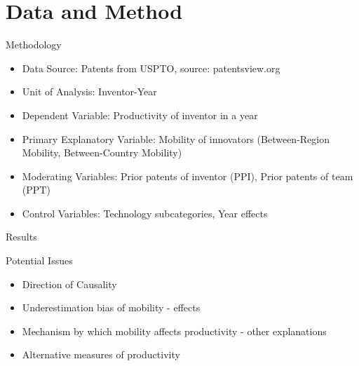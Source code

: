 \documentclass{beamer}
\begin{document}
\section{Data and Method}
\begin{frame}{Methodology}{}
\begin{itemize}
\item{Data Source: Patents from USPTO, source: patentsview.org}
\item{Unit of Analysis: Inventor-Year}
\item{Dependent Variable: Productivity of inventor in a year}
\item{Primary Explanatory Variable: Mobility of innovators (Between-Region Mobility, Between-Country Mobility)}
\item{Moderating Variables: Prior patents of inventor (PPI), Prior patents of team (PPT) }
\item{Control Variables: Technology subcategories,  Year effects}
\end{itemize}
\end{frame}

\begin{frame}{Results}{}

\end{frame}

\begin{frame}{Potential Issues}{}
\begin{itemize}
\item{Direction of Causality}
\item{Underestimation bias of mobility - effects}
\item{Mechanism by which mobility affects productivity - other explanations}
\item{Alternative measures of productivity }
\end{itemize}
\end{frame}





\end{document}
